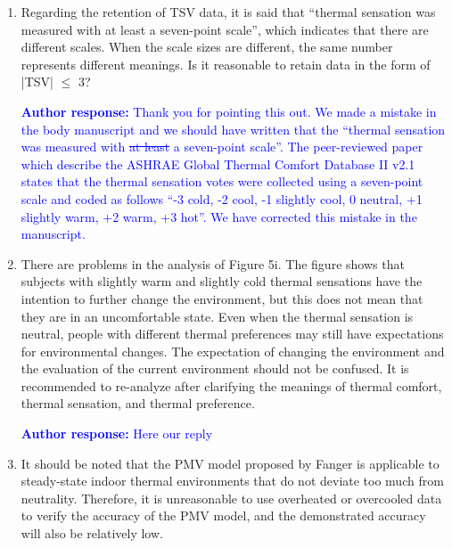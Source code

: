 \documentclass[a4paper, 10pt]{letter}
\newcommand{\response}[1]{\textcolor{blue}{\textbf{Author response:} #1}}
\begin{document}
\begin{letter}
\begin{enumerate}
            \item Regarding the retention of TSV data, it is said that ``thermal sensation was measured with at least a seven-point scale'', which indicates that there are different scales.
            When the scale sizes are different, the same number represents different meanings.
            Is it reasonable to retain data in the form of |TSV| $\leq$ 3?

            \response{
            Thank you for pointing this out.
            We made a mistake in the body manuscript and we should have written that the ``thermal sensation was measured with \sout{at least} a seven-point scale''.
            The peer-reviewed paper which describe the ASHRAE Global Thermal Comfort Database II v2.1 states that the thermal sensation votes were collected using a seven-point scale and coded as follows ``-3 cold, -2 cool, -1 slightly cool, 0 neutral, +1 slightly warm, +2 warm, +3 hot''.
            We have corrected this mistake in the manuscript.
            }

            \item There are problems in the analysis of Figure 5i.
            The figure shows that subjects with slightly warm and slightly cold thermal sensations have the intention to further change the environment, but this does not mean that they are in an uncomfortable state.
            Even when the thermal sensation is neutral, people with different thermal preferences may still have expectations for environmental changes.
            The expectation of changing the environment and the evaluation of the current environment should not be confused.
            It is recommended to re-analyze after clarifying the meanings of thermal comfort, thermal sensation, and thermal preference.

            \response{Here our reply}

            \item It should be noted that the PMV model proposed by Fanger is applicable to steady-state indoor thermal environments that do not deviate too much from neutrality.
            Therefore, it is unreasonable to use overheated or overcooled data to verify the accuracy of the PMV model, and the demonstrated accuracy will also be relatively low.


\end{enumerate}
\end{letter}
\end{document}
